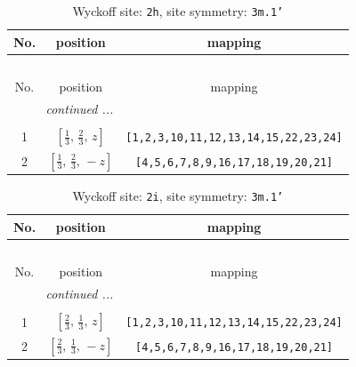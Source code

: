 \documentclass[fleqn,8pt]{jsarticle}
\begin{document}
\begin{longtable}{ccc}
\caption{Wyckoff site: {\tt 2h}, site symmetry: {\tt 3m.1'}}
 \\
 \hline \hline
No. & position & mapping \\ \hline \endfirsthead

\multicolumn{2}{l}{\tablename\ \thetable{}} \\
 \hline \hline
No. & position & mapping \\ \hline \endhead

 \hline \hline
\multicolumn{2}{r}{\footnotesize\it continued ...} \\ \endfoot

 \hline \hline
\multicolumn{2}{r}{} \\ \endlastfoot

1 & $\left[ \frac{1}{3},\, \frac{2}{3},\, z \right]$ & {\tt [1,2,3,10,11,12,13,14,15,22,23,24]} \\ \hline
2 & $\left[ \frac{1}{3},\, \frac{2}{3},\, - z \right]$ & {\tt [4,5,6,7,8,9,16,17,18,19,20,21]} \\
\end{longtable}
\renewcommand{\arraystretch}{1.2}
\begin{longtable}{ccc}
\caption{Wyckoff site: {\tt 2i}, site symmetry: {\tt 3m.1'}}
 \\
 \hline \hline
No. & position & mapping \\ \hline \endfirsthead

\multicolumn{2}{l}{\tablename\ \thetable{}} \\
 \hline \hline
No. & position & mapping \\ \hline \endhead

 \hline \hline
\multicolumn{2}{r}{\footnotesize\it continued ...} \\ \endfoot

 \hline \hline
\multicolumn{2}{r}{} \\ \endlastfoot

1 & $\left[ \frac{2}{3},\, \frac{1}{3},\, z \right]$ & {\tt [1,2,3,10,11,12,13,14,15,22,23,24]} \\ \hline
2 & $\left[ \frac{2}{3},\, \frac{1}{3},\, - z \right]$ & {\tt [4,5,6,7,8,9,16,17,18,19,20,21]} \\
\end{longtable}
\renewcommand{\arraystretch}{1.2}
\end{document}

